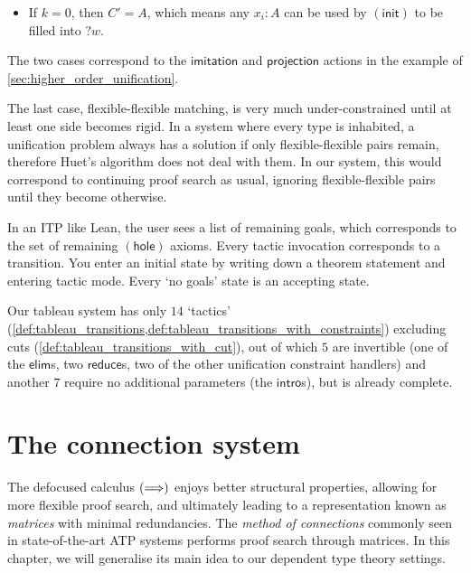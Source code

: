 \documentclass[twoside]{report}
\begin{document}
\begin{example}
\begin{itemize}
        \item If $k = 0$, then $C' = A$, which means any $x_i : A$ can be used by $(\mathsf{init})$ to be filled into ${?w}$.
    \end{itemize}
    The two cases correspond to the $\mathsf{imitation}$ and $\mathsf{projection}$ actions in the example of \cref{sec:higher_order_unification}.
\end{example}

The last case, flexible-flexible matching, is very much under-constrained until at least one side becomes rigid. In a system where every type is inhabited, a unification problem always has a solution if only flexible-flexible pairs remain, therefore Huet's algorithm does not deal with them. In our system, this would correspond to continuing proof search as usual, ignoring flexible-flexible pairs until they become otherwise.


In an ITP like Lean, the user sees a list of remaining goals, which corresponds to the set of remaining $(\mathsf{hole})$ axioms. Every tactic invocation corresponds to a transition. You enter an initial state by writing down a theorem statement and entering tactic mode. Every `no goals' state is an accepting state.

Our tableau system has only $14$ `tactics' (\cref{def:tableau_transitions,def:tableau_transitions_with_constraints}) excluding cuts (\cref{def:tableau_transitions_with_cut}), out of which $5$ are invertible (one of the $\mathsf{elim}$s, two $\mathsf{reduce}$s, two of the other unification constraint handlers) and another $7$ require no additional parameters (the $\mathsf{intro}$s), but is already complete.


\chapter{The connection system}
\label{sec:the_connection_system}

The defocused calculus $(\Longrightarrow)$ enjoys better structural properties, allowing for more flexible proof search, and ultimately leading to a representation known as \emph{matrices} with minimal redundancies. The \emph{method of connections} commonly seen in state-of-the-art ATP systems performs proof search through matrices. In this chapter, we will generalise its main idea to our dependent type theory settings.
\end{document}
